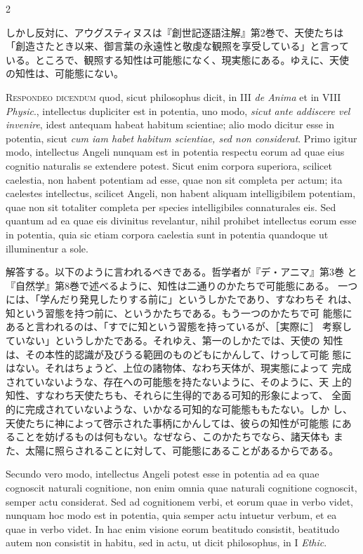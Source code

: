 \documentclass[paper=a4paper,fontsize=10pt,jafontsize=9pt,titlepage]{jlreq}
\begin{document}
\begin{paracol}{2}
\switchcolumn

しかし反対に、アウグスティヌスは『創世記逐語注解』第2巻で、天使たちは
「創造さたとき以来、御言葉の永遠性と敬虔な観照を享受している」と言って
いる。ところで、観照する知性は可能態になく、現実態にある。ゆえに、天使
の知性は、可能態にない。

\switchcolumn*

{\scshape Respondeo dicendum} quod, sicut philosophus
dicit, in III {\itshape de Anima} et in VIII {\itshape Physic}., intellectus dupliciter est in
potentia, uno modo, {\itshape sicut ante addiscere vel invenire}, idest antequam
habeat habitum scientiae; alio modo dicitur esse in potentia, sicut {\itshape cum
iam habet habitum scientiae, sed non considerat}. Primo igitur modo,
intellectus Angeli nunquam est in potentia respectu eorum ad quae eius
cognitio naturalis se extendere potest. Sicut enim corpora superiora,
scilicet caelestia, non habent potentiam ad esse, quae non sit completa
per actum; ita caelestes intellectus, scilicet Angeli, non habent
aliquam intelligibilem potentiam, quae non sit totaliter completa per
species intelligibiles connaturales eis. 
Sed quantum ad ea quae eis
divinitus revelantur, nihil prohibet intellectus eorum esse in potentia,
quia sic etiam corpora caelestia sunt in potentia quandoque ut
illuminentur a sole.

\switchcolumn

解答する。以下のように言われるべきである。哲学者が『デ・アニマ』第3巻
と『自然学』第8巻で述べるように、知性は二通りのかたちで可能態にある。
一つには、「学んだり発見したりする前に」というしかたであり、すなわちそ
れは、知という習態を持つ前に、というかたちである。もう一つのかたちで可
能態にあると言われるのは、「すでに知という習態を持っているが、［実際に］
考察していない」というしかたである。それゆえ、第一のしかたでは、天使の
知性は、その本性的認識が及びうる範囲のものどもにかんして、けっして可能
態にはない。それはちょうど、上位の諸物体、なわち天体が、現実態によって
完成されていないような、存在への可能態を持たないように、そのように、天
上的知性、すなわち天使たちも、それらに生得的である可知的形象によって、
全面的に完成されていないような、いかなる可知的な可能態ももたない。しか
し、天使たちに神によって啓示された事柄にかんしては、彼らの知性が可能態
にあることを妨げるものは何もない。なぜなら、このかたちでなら、諸天体も
また、太陽に照らされることに対して、可能態にあることがあるからである。

\switchcolumn*

Secundo vero modo, intellectus Angeli potest esse
in potentia ad ea quae cognoscit naturali cognitione, non enim omnia
quae naturali cognitione cognoscit, semper actu considerat. Sed ad
cognitionem verbi, et eorum quae in verbo videt, nunquam hoc modo est in
potentia, quia semper actu intuetur verbum, et ea quae in verbo
videt. In hac enim visione eorum beatitudo consistit, beatitudo autem
non consistit in habitu, sed in actu, ut dicit philosophus, in I {\itshape Ethic}.


\end{paracol}
\end{document}

